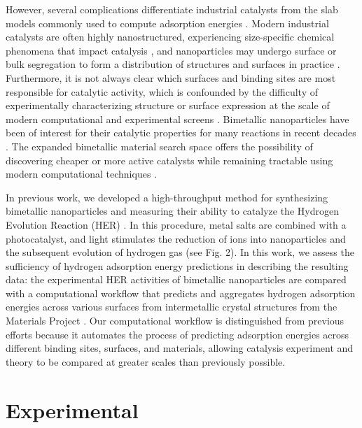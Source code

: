 \documentclass[preprint,12pt]{elsarticle}
\begin{document}
 However, several complications differentiate industrial catalysts from the slab models commonly used to compute adsorption energies \cite{norskov2005trends,tran2018active}. Modern industrial catalysts are often highly nanostructured, experiencing size-specific chemical phenomena that impact catalysis \cite{khorshidi2018strain}, and nanoparticles may undergo surface or bulk segregation to form a distribution of structures and surfaces in practice \cite{mitchell2021nanoscale,vallee2001size}. Furthermore, it is not always clear which surfaces and binding sites are most responsible for catalytic activity, which is confounded by the difficulty of experimentally characterizing structure or surface expression at the scale of modern computational and experimental screens \cite{yang2022applications}. Bimetallic nanoparticles have been of interest for their catalytic properties for many reactions in recent decades \cite{toshima1998bimetallic,singh2013synergistic}. The expanded bimetallic material search space offers the possibility of discovering cheaper or more active catalysts while remaining tractable using modern computational techniques \cite{tran2018active}.
 
 
In previous work, we developed a high-throughput method for synthesizing bimetallic nanoparticles and measuring their ability to catalyze the Hydrogen Evolution Reaction (HER) \cite{lopato2020parallelized,bhat2022accelerated,simon2022ligand}. In this procedure, metal salts are combined with a photocatalyst, and light stimulates the reduction of ions into nanoparticles and the subsequent evolution of hydrogen gas (see Fig. 2). In this work, we assess the sufficiency of hydrogen adsorption energy predictions in describing the resulting data: the experimental HER activities of bimetallic nanoparticles are compared with a computational workflow that predicts and aggregates hydrogen adsorption energies across various surfaces from intermetallic crystal structures from the Materials Project \cite{ong2013python}. Our computational workflow is distinguished from previous efforts because it automates the process of predicting adsorption energies across different binding sites, surfaces, and materials, allowing catalysis experiment and theory to be compared at greater scales than previously possible.

\section{Experimental}\label{Section:Experimental}
\end{document}
